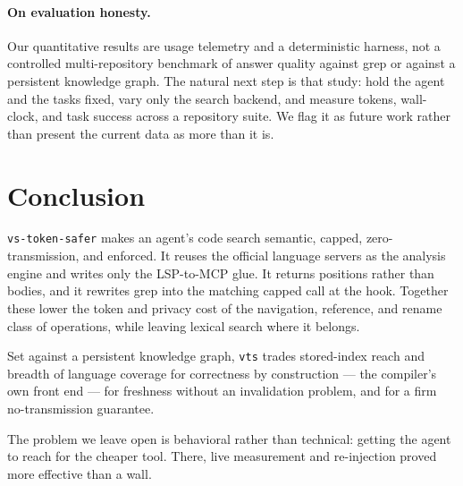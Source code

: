 \documentclass[11pt]{article}
\begin{document}
\paragraph{On evaluation honesty.}
Our quantitative results are usage telemetry and a deterministic harness, not a
controlled multi-repository benchmark of answer quality against grep or against a
persistent knowledge graph. The natural next step is that study: hold the agent and
the tasks fixed, vary only the search backend, and measure tokens, wall-clock, and
task success across a repository suite. We flag it as future work rather than present
the current data as more than it is.

\section{Conclusion}
\label{sec:conc}

\texttt{vs-token-safer} makes an agent's code search semantic, capped,
zero-transmission, and enforced. It reuses the official language servers as the
analysis engine and writes only the LSP-to-MCP glue. It returns positions rather
than bodies, and it rewrites grep into the matching capped call at the hook.
Together these lower the token and privacy cost of the navigation, reference, and
rename class of operations, while leaving lexical search where it belongs.

Set against a persistent knowledge graph, \texttt{vts} trades stored-index reach and
breadth of language coverage for correctness by construction --- the compiler's own
front end --- for freshness without an invalidation problem, and for a firm
no-transmission guarantee.

The problem we leave open is behavioral rather than technical: getting the agent to
reach for the cheaper tool. There, live measurement and re-injection proved more
effective than a wall.
\end{document}
